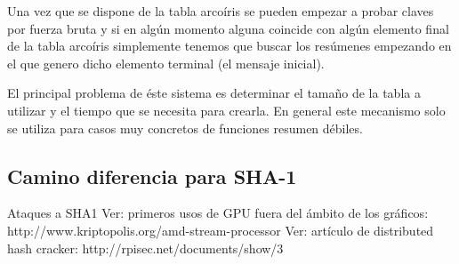 Una vez que se dispone de la tabla arcoíris se pueden empezar a probar claves por fuerza bruta y si en algún momento alguna coincide con algún elemento final de la tabla arcoíris simplemente tenemos que buscar los resúmenes empezando en el que genero dicho elemento terminal (el mensaje inicial).

El principal problema de éste sistema es determinar el tamaño de la tabla a utilizar y el tiempo que se necesita para crearla. En general este mecanismo solo se utiliza para casos muy concretos de funciones resumen débiles.

\subsection{Camino diferencia para SHA-1\cite{citeulike:7684257}}
Ataques a SHA1
Ver: primeros usos de GPU fuera del ámbito de los gráficos: http://www.kriptopolis.org/amd-stream-processor
Ver: artículo de distributed hash cracker: http://rpisec.net/documents/show/3


